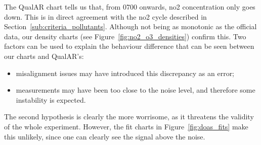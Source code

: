 The QualAR chart tells us that, from 0700 onwards, \gls{no2}
concentration only goes down. This is in direct agreement with the
\gls{no2} cycle described in Section~\ref{sub:criteria_pollutants}.
Although not being as monotonic as the official data, our density charts
(see Figure~\ref{fig:no2_o3_densities}) confirm this. Two factors can be
used to explain the behaviour difference that can be seen between our
charts and QualAR's:
\begin{itemize}
    \item misalignment issues may have introduced this discrepancy as an
        error;
    \item measurements may have been too close to the noise level, and
        therefore some instability is expected.
\end{itemize}

The second hypothesis is clearly the more worrisome, as it threatens the
validity of the whole experiment. However, the fit charts in
Figure~\ref{fig:doas_fits} make this unlikely, since one can clearly see
the signal above the noise.
